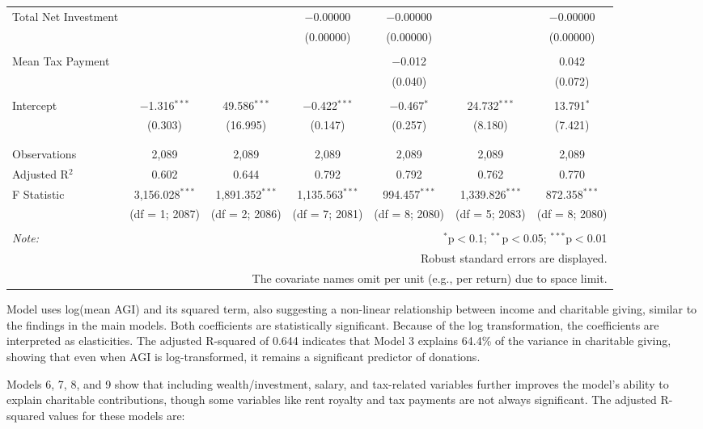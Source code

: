 \documentclass[
  letterpaper,
  DIV=11,
  numbers=noendperiod]{scrartcl}
\begin{document}
\begin{table}[!htbp]
\begin{tabular}{@{\extracolsep{.001pt}}lcccccc}
 Total Net Investment &  &  & $-$0.00000 & $-$0.00000 &  & $-$0.00000 \\ 
  &  &  & (0.00000) & (0.00000) &  & (0.00000) \\ 
  & & & & & & \\ 
 Mean Tax Payment &  &  &  & $-$0.012 &  & 0.042 \\ 
  &  &  &  & (0.040) &  & (0.072) \\ 
  & & & & & & \\ 
 Intercept & $-$1.316$^{***}$ & 49.586$^{***}$ & $-$0.422$^{***}$ & $-$0.467$^{*}$ & 24.732$^{***}$ & 13.791$^{*}$ \\ 
  & (0.303) & (16.995) & (0.147) & (0.257) & (8.180) & (7.421) \\ 
  & & & & & & \\ 
\hline \\[-1.8ex] 
Observations & 2,089 & 2,089 & 2,089 & 2,089 & 2,089 & 2,089 \\ 
Adjusted R$^{2}$ & 0.602 & 0.644 & 0.792 & 0.792 & 0.762 & 0.770 \\ 
F Statistic & 3,156.028$^{***}$  & 1,891.352$^{***}$  & 1,135.563$^{***}$  & 994.457$^{***}$  & 1,339.826$^{***}$  & 872.358$^{***}$  \\ 
 & (df = 1; 2087) & (df = 2; 2086) & (df = 7; 2081) & (df = 8; 2080) & (df = 5; 2083) & (df = 8; 2080) \\
\hline 
\hline \\[-1.8ex] 
\textit{Note:}  & \multicolumn{6}{r}{$^{*}$p$<$0.1; $^{**}$p$<$0.05; $^{***}$p$<$0.01} \\ 
 & \multicolumn{6}{r}{Robust standard errors are displayed.} \\ 
 & \multicolumn{6}{r}{The covariate names omit per unit (e.g., per return) due to space limit.} \\ 
\end{tabular} 
\end{table}

Model uses log(mean AGI) and its squared term, also suggesting a
non-linear relationship between income and charitable giving, similar to
the findings in the main models. Both coefficients are statistically
significant. Because of the log transformation, the coefficients are
interpreted as elasticities. The adjusted R-squared of 0.644 indicates
that Model 3 explains 64.4\% of the variance in charitable giving,
showing that even when AGI is log-transformed, it remains a significant
predictor of donations.

Models 6, 7, 8, and 9 show that including wealth/investment, salary, and
tax-related variables further improves the model's ability to explain
charitable contributions, though some variables like rent royalty and
tax payments are not always significant. The adjusted R-squared values
for these models are:
\end{document}
